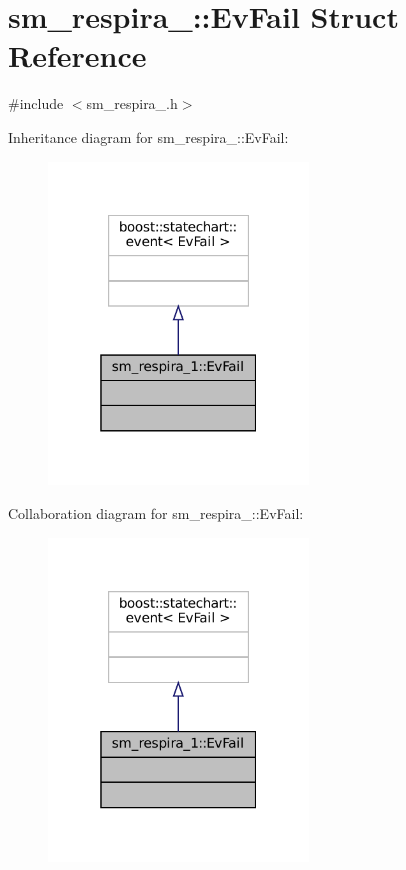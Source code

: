 \hypertarget{structsm__respira__1_1_1EvFail}{}\section{sm\+\_\+respira\+\_\+:\+:Ev\+Fail Struct Reference}
\label{structsm__respira__1_1_1EvFail}


{\ttfamily \#include $<$sm\+\_\+respira\+\_.\+h$>$}



Inheritance diagram for sm\+\_\+respira\+\_\+:\+:Ev\+Fail\+:
\nopagebreak
\begin{figure}[H]
\begin{center}
\leavevmode
\includegraphics[width=196pt]{structsm__respira__1_1_1EvFail__inherit__graph}
\end{center}
\end{figure}


Collaboration diagram for sm\+\_\+respira\+\_\+:\+:Ev\+Fail\+:
\nopagebreak
\begin{figure}[H]
\begin{center}
\leavevmode
\includegraphics[width=196pt]{structsm__respira__1_1_1EvFail__coll__graph}
\end{center}
\end{figure}


